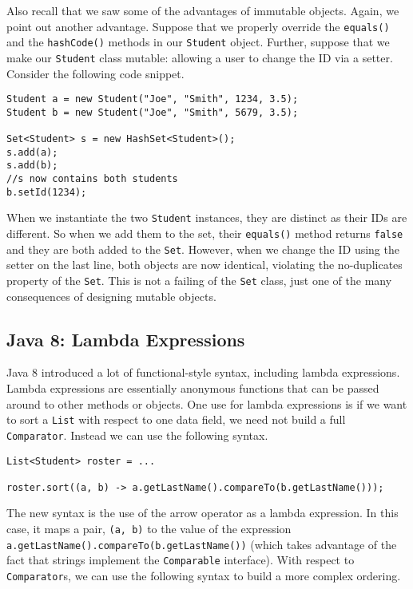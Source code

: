 Also recall that we saw some of the advantages of immutable objects. 
Again, we point out another advantage.  Suppose that we properly 
override the \texttt{equals()} and the \texttt{hashCode()} 
methods in our \texttt{Student} object.  Further, suppose
that we make our \texttt{Student} class mutable: allowing
a user to change the ID via a setter.  Consider the following code snippet.

\begin{verbatim}
Student a = new Student("Joe", "Smith", 1234, 3.5);		
Student b = new Student("Joe", "Smith", 5679, 3.5);
		
Set<Student> s = new HashSet<Student>();
s.add(a);
s.add(b);
//s now contains both students
b.setId(1234);
\end{verbatim}

When we instantiate the two \texttt{Student} instances, they
are distinct as their IDs are different.  So when we add them to the set, 
their \texttt{equals()} method returns \texttt{false}
and they are both added to the \texttt{Set}.  However, when 
we change the ID using the setter on the last line, both objects are now
identical, violating the no-duplicates property of the \texttt{Set}.
This is not a failing of the \texttt{Set} class, just one of
the many consequences of designing mutable objects.  


\subsection{Java 8: Lambda Expressions}

Java 8 introduced a lot of functional-style syntax, including 
\glspl{lambda expression}.  Lambda expressions are essentially anonymous
functions that can be passed around to other methods or objects.
One use for lambda expressions is if we want to sort a \texttt{List}
with respect to one data field, we need not build a full 
\texttt{Comparator}.  Instead we can use the following syntax.

\begin{verbatim}
List<Student> roster = ...

roster.sort((a, b) -> a.getLastName().compareTo(b.getLastName()));
\end{verbatim}

The new syntax is the use of the arrow operator as a lambda 
expression.  In this case, it maps a pair, \texttt{(a, b)}
to the value of the expression 
\texttt{a.getLastName().compareTo(b.getLastName())}
(which takes advantage of the fact that strings implement the 
\texttt{Comparable} interface).  With respect to 
\texttt{Comparator}s, we can use the following 
syntax to build a more complex ordering.

